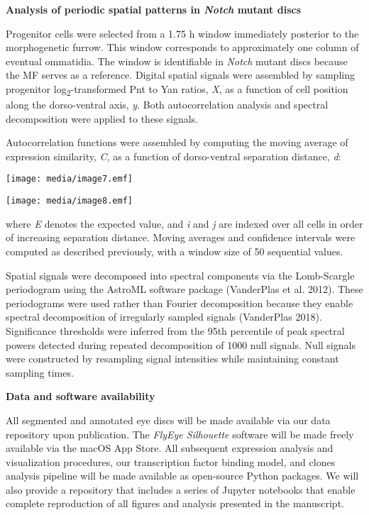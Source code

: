 \textbf{Analysis of periodic spatial patterns in \emph{Notch} mutant discs}

Progenitor cells were selected from a 1.75 h window immediately posterior to the morphogenetic furrow. This window corresponds to approximately one column of eventual ommatidia. The window is identifiable in \emph{Notch} mutant discs because the MF serves as a reference. Digital spatial signals were assembled by sampling progenitor log\textsubscript{2}-transformed Pnt to Yan ratios, \emph{X}, as a function of cell position along the dorso-ventral axis, \emph{y}. Both autocorrelation analysis and spectral decomposition were applied to these signals.

Autocorrelation functions were assembled by computing the moving average of expression similarity, \emph{C}, as a function of dorso-ventral separation distance, \emph{d}:

\texttt{[image: media/image7.emf]}

\texttt{[image: media/image8.emf]}

where \emph{E} denotes the expected value, and \emph{i} and \emph{j} are indexed over all cells in order of increasing separation distance. Moving averages and confidence intervals were computed as described previously, with a window size of 50 sequential values.

Spatial signals were decomposed into spectral components via the Lomb-Scargle periodogram using the AstroML software package (VanderPlas et al. 2012). These periodograms were used rather than Fourier decomposition because they enable spectral decomposition of irregularly sampled signals (VanderPlas 2018). Significance thresholds were inferred from the 95th percentile of peak spectral powers detected during repeated decomposition of 1000 null signals. Null signals were constructed by resampling signal intensities while maintaining constant sampling times.

\textbf{Data and software availability}

All segmented and annotated eye discs will be made available via our data repository upon publication. The \emph{FlyEye Silhouette} software will be made freely available via the macOS App Store. All subsequent expression analysis and visualization procedures, our transcription factor binding model, and clones analysis pipeline will be made available as open-source Python packages. We will also provide a repository that includes a series of Jupyter notebooks that enable complete reproduction of all figures and analysis presented in the manuscript.

